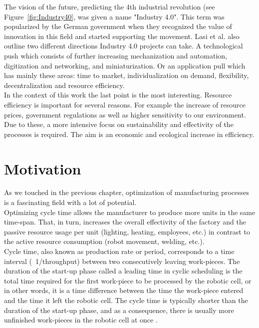 The vision of the future, predicting the 4th industrial revolution (see Figure~\ref{fig:Industry40}, was given a name "Industry 4.0". This term was popularized by the German government when they recognized the value of innovation in this field and started supporting the movement. Lasi et al. \cite{Industry40} also outline two different directions Industry 4.0 projects can take. A technological push which consists of further increasing mechanization and automation, digitization and networking, and miniaturization. Or an application pull which has mainly these areas: time to market, individualization on demand, flexibility, decentralization and resource efficiency. \\

In the context of this work the last point is the most interesting.
Resource efficiency is important for several reasons.
For example the increase of resource prices, government regulations as well as higher sensitivity to our environment. Due to these, a more intensive focus on sustainability and effectivity of the processes is required. 
The aim is an economic and ecological increase in efficiency. 

\section{Motivation}
\label{ch:motivation}

As we touched in the previous chapter, optimization of manufacturing processes is a fascinating field with a lot of potential. \\

Optimizing cycle time allows the manufacturer to produce more units in the same time-span. That, in turn, increases the overall effectivity of the factory and the passive resource usage per unit (lighting, heating, employees, etc.) in contrast to the active resource consumption (robot movement, welding, etc.). \\

Cycle time, also known as production rate or period, corresponds to a time interval (~1/throughput) between two consecutively leaving work-pieces.
The duration of the start-up phase called a leading time in cyclic scheduling is the total time required for the first work-piece to be processed by the robotic cell, or in other words, it is a time difference between the time the work-piece entered and the time it left the robotic cell.
The cycle time is typically shorter than the duration of the
start-up phase, and as a consequence, there is usually more unfinished work-pieces in the robotic cell at once \cite{EnergyOptimisationBukata}. \\

